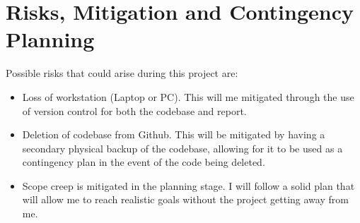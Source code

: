 \documentclass[proposal]{cmpreport}
\begin{document}
\section{Risks, Mitigation and Contingency Planning}
Possible risks that could arise during this project are:

\begin{itemize}
        \item Loss of workstation (Laptop or PC). This will me mitigated through the 
              use of version control for both the codebase and report.
        \item Deletion of codebase from Github. This will be mitigated by having a 
              secondary physical backup of the codebase, allowing for it to be used 
              as a contingency plan in the event of the code being deleted.
        \item Scope creep is mitigated in the planning stage. I will follow a solid 
              plan that will allow me to reach realistic goals without the project 
              getting away from me.
\end{itemize}
\end{document}
